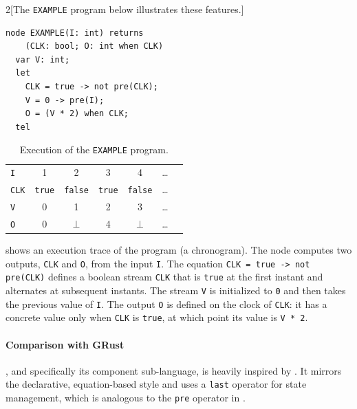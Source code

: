 \begin{multicols}{2}[The \texttt{EXAMPLE} program below illustrates these features.]
  \begin{lstlisting}[basicstyle=\ttfamily\footnotesize\color{BlackText}]
  node EXAMPLE(I: int) returns
    (CLK: bool; O: int when CLK)
  var V: int;
  let
    CLK = true -> not pre(CLK);
    V = 0 -> pre(I);
    O = (V * 2) when CLK;
  tel
\end{lstlisting}

  \newcolumn

  \hfill

  \begin{table}[H]
    \centering
    \begin{tabular}{l|cccccc}
      \texttt{I}   & 1             & 2              & 3             & 4              & \dots \\
      \texttt{CLK} & \texttt{true} & \texttt{false} & \texttt{true} & \texttt{false} & \dots \\
      \texttt{V}   & 0             & 1              & 2             & 3              & \dots \\
      \texttt{O}   & 0             & $\bot$         & 4             & $\bot$         & \dots \\
    \end{tabular}
    \caption{Execution of the \texttt{EXAMPLE} program.}
    \label{tab:sota:synchronous:lustre:exec}
  \end{table}
\end{multicols}

 shows an execution trace of the program (a chronogram). The
node computes two outputs, \texttt{CLK} and \texttt{O}, from the input \texttt{I}. The equation
\texttt{CLK = true -> not pre(CLK)} defines a boolean stream \texttt{CLK} that is \texttt{true} at the
first instant and alternates at subsequent instants. The stream \texttt{V} is initialized to
\texttt{0} and then takes the previous value of \texttt{I}. The output \texttt{O} is defined on the
clock of \texttt{CLK}: it has a concrete value only when \texttt{CLK} is \texttt{true}, at which point
its value is \texttt{V * 2}.

\paragraph*{Comparison with GRust}

\GRust, and specifically its \GRSync component sub-language, is heavily inspired by \Lustre. It mirrors
the declarative, equation-based style and uses a \texttt{last} operator for state management, which
is analogous to the \texttt{pre} operator in \Lustre.

